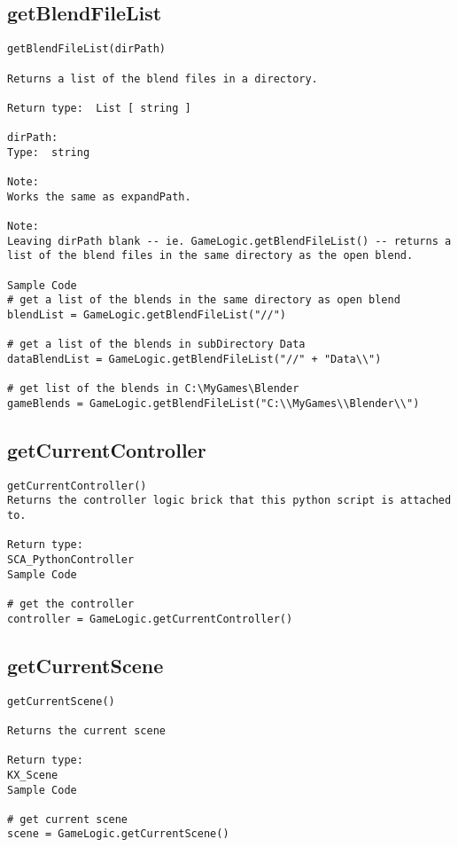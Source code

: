 \subsection{getBlendFileList}
\begin{verbatim}
getBlendFileList(dirPath)

Returns a list of the blend files in a directory.

Return type:  List [ string ]

dirPath:
Type:  string

Note:
Works the same as expandPath.

Note:  
Leaving dirPath blank -- ie. GameLogic.getBlendFileList() -- returns a list of the blend files in the same directory as the open blend.

Sample Code
# get a list of the blends in the same directory as open blend
blendList = GameLogic.getBlendFileList("//")

# get a list of the blends in subDirectory Data
dataBlendList = GameLogic.getBlendFileList("//" + "Data\\")

# get list of the blends in C:\MyGames\Blender
gameBlends = GameLogic.getBlendFileList("C:\\MyGames\\Blender\\")
\end{verbatim}

\subsection{getCurrentController}
\begin{verbatim}
getCurrentController()
Returns the controller logic brick that this python script is attached to.

Return type:
SCA_PythonController
Sample Code

# get the controller
controller = GameLogic.getCurrentController()
\end{verbatim}


\subsection{getCurrentScene}
\begin{verbatim}
getCurrentScene()

Returns the current scene

Return type:
KX_Scene
Sample Code

# get current scene
scene = GameLogic.getCurrentScene()
\end{verbatim}


